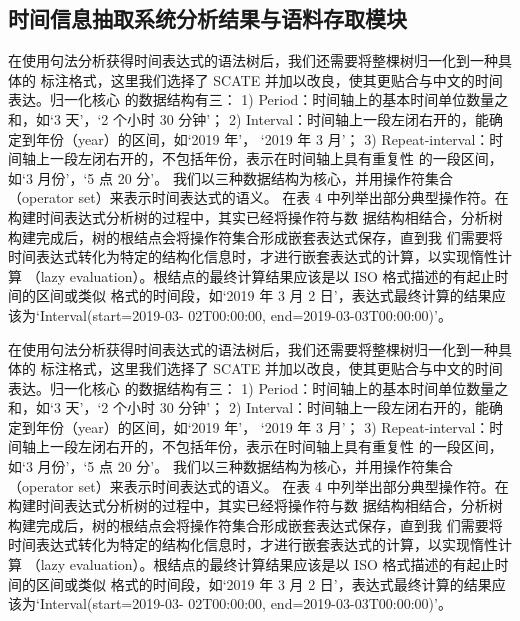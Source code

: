 \subsection{时间信息抽取系统分析结果与语料存取模块}

在使用句法分析获得时间表达式的语法树后，我们还需要将整棵树归一化到一种具体的
标注格式，这里我们选择了 SCATE 并加以改良，使其更贴合与中文的时间表达。归一化核心
的数据结构有三：
1) Period：时间轴上的基本时间单位数量之和，如‘3 天’，‘2 个小时 30 分钟’；
2) Interval：时间轴上一段左闭右开的，能确定到年份（year）的区间，如‘2019 年’，
‘2019 年 3 月’；
3) Repeat-interval：时间轴上一段左闭右开的，不包括年份，表示在时间轴上具有重复性
的一段区间，如‘3 月份’，‘5 点 20 分’。
我们以三种数据结构为核心，并用操作符集合（operator set）来表示时间表达式的语义。
在表 4 中列举出部分典型操作符。在构建时间表达式分析树的过程中，其实已经将操作符与数
据结构相结合，分析树构建完成后，树的根结点会将操作符集合形成嵌套表达式保存，直到我
们需要将时间表达式转化为特定的结构化信息时，才进行嵌套表达式的计算，以实现惰性计算
（lazy evaluation）。根结点的最终计算结果应该是以 ISO 格式描述的有起止时间的区间或类似
格式的时间段，如‘2019 年 3 月 2 日’，表达式最终计算的结果应该为‘Interval(start=2019-03-
02T00:00:00, end=2019-03-03T00:00:00)’。

在使用句法分析获得时间表达式的语法树后，我们还需要将整棵树归一化到一种具体的
标注格式，这里我们选择了 SCATE 并加以改良，使其更贴合与中文的时间表达。归一化核心
的数据结构有三：
1) Period：时间轴上的基本时间单位数量之和，如‘3 天’，‘2 个小时 30 分钟’；
2) Interval：时间轴上一段左闭右开的，能确定到年份（year）的区间，如‘2019 年’，
‘2019 年 3 月’；
3) Repeat-interval：时间轴上一段左闭右开的，不包括年份，表示在时间轴上具有重复性
的一段区间，如‘3 月份’，‘5 点 20 分’。
我们以三种数据结构为核心，并用操作符集合（operator set）来表示时间表达式的语义。
在表 4 中列举出部分典型操作符。在构建时间表达式分析树的过程中，其实已经将操作符与数
据结构相结合，分析树构建完成后，树的根结点会将操作符集合形成嵌套表达式保存，直到我
们需要将时间表达式转化为特定的结构化信息时，才进行嵌套表达式的计算，以实现惰性计算
（lazy evaluation）。根结点的最终计算结果应该是以 ISO 格式描述的有起止时间的区间或类似
格式的时间段，如‘2019 年 3 月 2 日’，表达式最终计算的结果应该为‘Interval(start=2019-03-
02T00:00:00, end=2019-03-03T00:00:00)’。

